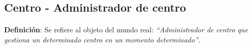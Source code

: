 \subsection{Centro - Administrador de centro}

  \paragraph{}\textbf{Definición}: Se refiere al objeto del mundo real:
  \emph{``Administrador de centro que gestiona un determinado centro en un
  momento determinado''}.




